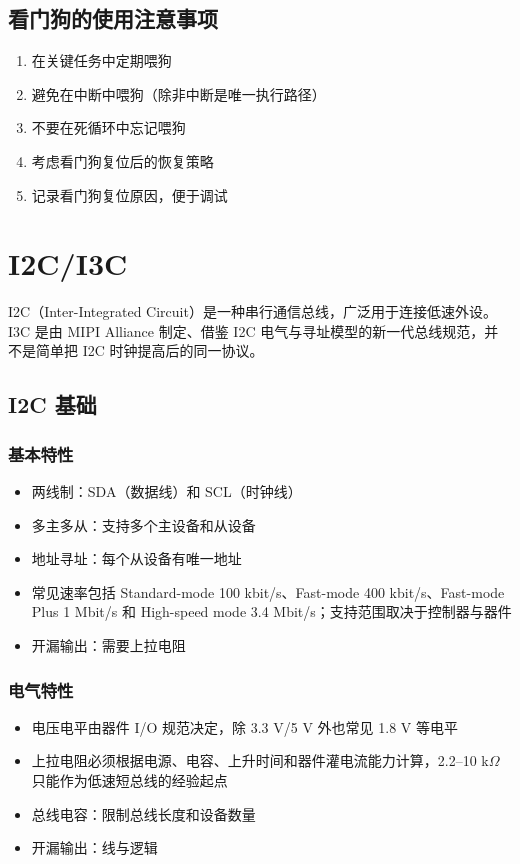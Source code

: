 \subsection{看门狗的使用注意事项}

\begin{enumerate}
  \item 在关键任务中定期喂狗
  \item 避免在中断中喂狗（除非中断是唯一执行路径）
  \item 不要在死循环中忘记喂狗
  \item 考虑看门狗复位后的恢复策略
  \item 记录看门狗复位原因，便于调试
\end{enumerate}

\section{I2C/I3C}

I2C（Inter-Integrated Circuit）是一种串行通信总线，广泛用于连接低速外设。
I3C 是由 MIPI Alliance 制定、借鉴 I2C 电气与寻址模型的新一代总线规范，并不是简单把 I2C 时钟提高后的同一协议。

\subsection{I2C 基础}

\subsubsection{基本特性}

\begin{itemize}
  \item 两线制：SDA（数据线）和 SCL（时钟线）
  \item 多主多从：支持多个主设备和从设备
  \item 地址寻址：每个从设备有唯一地址
  \item 常见速率包括 Standard-mode 100 kbit/s、Fast-mode 400 kbit/s、Fast-mode Plus 1 Mbit/s 和 High-speed mode 3.4 Mbit/s；支持范围取决于控制器与器件
  \item 开漏输出：需要上拉电阻
\end{itemize}

\subsubsection{电气特性}

\begin{itemize}
  \item 电压电平由器件 I/O 规范决定，除 3.3 V/5 V 外也常见 1.8 V 等电平
  \item 上拉电阻必须根据电源、电容、上升时间和器件灌电流能力计算，2.2--10 k$\Omega$ 只能作为低速短总线的经验起点
  \item 总线电容：限制总线长度和设备数量
  \item 开漏输出：线与逻辑
\end{itemize}

